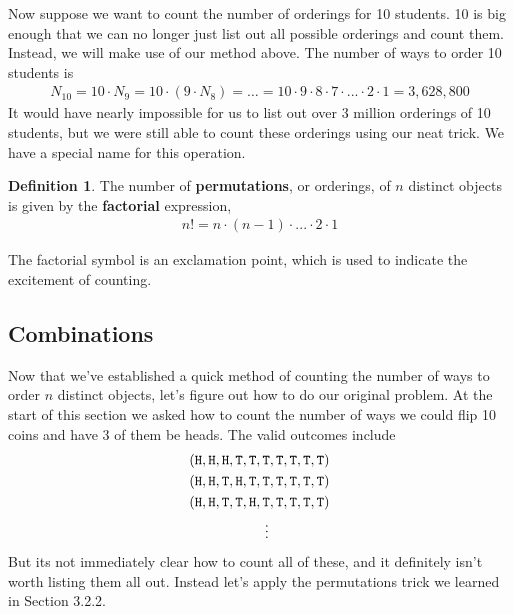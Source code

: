 \documentclass{tufte-book}
\newcommand\hd{\texttt{H}}
\newcommand\tl{\texttt{T}}
\theoremstyle{definition}
\numberwithin{theorem}{section}
\newtheorem{definition}[theorem]{Definition}
\numberwithin{definition}{section}
\numberwithin{lemma}{section}
\numberwithin{corollary}{section}
\numberwithin{proposition}{section}
\numberwithin{remark}{section}
\numberwithin{claim}{section}
\numberwithin{observation}{section}
\numberwithin{fact}{section}
\numberwithin{assumption}{section}
\numberwithin{example}{section}
\numberwithin{exercise}{section}
\begin{document}
Now suppose we want to count the number of orderings for 10 students. 10 is big enough that we can no longer just list out all possible orderings and count them. Instead, we will make use of our method above. The number of ways to order 10 students is
\begin{align*}
N_{10} = 10 \cdot N_9 = 10 \cdot (9 \cdot N_8) = \dots = 10 \cdot 9 \cdot 8 \cdot 7 \cdot ... \cdot 2 \cdot 1 = 3,628,800
\end{align*}
It would have nearly impossible for us to list out over 3 million orderings of 10 students, but we were still able to count these orderings using our neat trick. We have a special name for this operation.

\begin{definition}
The number of \textbf{permutations}, or orderings, of $n$ distinct objects is given by the \textbf{factorial} expression,
\begin{align*}
n! = n\cdot (n-1) \cdot ... \cdot 2 \cdot 1
\end{align*}
\end{definition}
The factorial symbol is an exclamation point, which is used to indicate the excitement of counting.

\subsection{Combinations}
Now that we've established a quick method of counting the number of ways to order $n$ distinct objects, let's figure out how to do our original problem. At the start of this section we asked how to count the number of ways we could flip 10 coins and have 3 of them be heads. The valid outcomes include
\begin{align*}
&(\hd,\hd,\hd,\tl,\tl,\tl,\tl,\tl,\tl,\tl) \\
&(\hd,\hd,\tl,\hd,\tl,\tl,\tl,\tl,\tl,\tl) \\
&(\hd,\hd,\tl,\tl,\hd,\tl,\tl,\tl,\tl,\tl) \\
&\hspace{1.9cm}\vdots
\end{align*}
But its not immediately clear how to count all of these, and it definitely isn't worth listing them all out. Instead let's apply the permutations trick we learned in Section 3.2.2.
\end{document}
